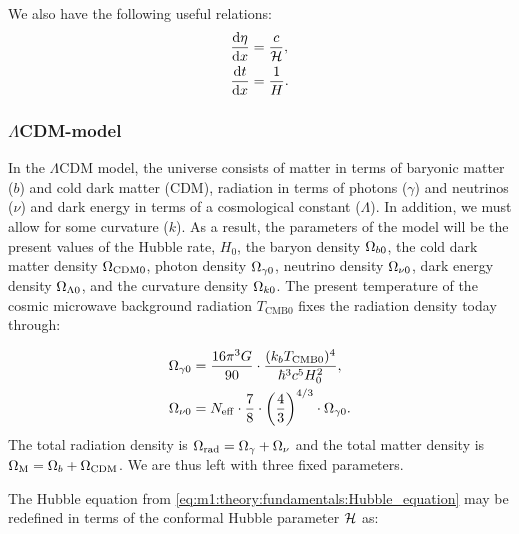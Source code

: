
    We also have the following useful relations:
    \begin{equation}
        \label{eq:m1:theory:measures:useful_relations}
        \begin{split}
            \dv{\eta}{x}&=\frac{c}{\mathcal{H}}, \\
             \dv{t}{x} &= \frac{1}{H}.
        \end{split}
    \end{equation}




\subsubsection{$\Lambda$CDM-model}

    In the $\Lambda$CDM model, the universe consists of matter in terms of baryonic matter ($b$) and cold dark matter (CDM), radiation in terms of photons ($\gamma$) and neutrinos ($\nu$) and dark energy in terms of a cosmological constant ($\Lambda$). In addition, we must allow for some curvature ($k$). As a result, the parameters of the model will be the present values of the Hubble rate, $H_0$, the baryon density $\Omega_{b0}$, the cold dark matter density $\Omega_{\mathrm{CDM}0}$, photon density $\Omega_{\gamma0}$, neutrino density $\Omega_{\nu0}$, dark energy density $\Omega_{\Lambda0}$, and the curvature density $\Omega_{k0}$. The present temperature of the cosmic microwave background radiation $T_{\mathrm{CMB}0}$ fixes the radiation density today through:

    \begin{equation}\label{eq:m1:theory:lambdaCDM:radiation_densities}
        \begin{split}
            \Omega_{\gamma0} &= \frac{16\pi^3G}{90}\cdot\frac{(k_b T_{\mathrm{CMB}0})^4}{\hbar^3c^5H_0^2}, \\
            \Omega_{\nu0} &= N_\mathrm{eff} \cdot\frac{7}{8} \cdot \left( \frac{4}{3} \right)^{4/3}\cdot \Omega_{\gamma0}.
        \end{split}
    \end{equation}
    The total radiation density is $\Omega_\mathrm{rad}=\Omega_\gamma+\Omega_\nu$ and the total matter density is $\Omega_\mathrm{M} = \Omega_b+\Omega_\mathrm{CDM}$. We are thus left with three fixed parameters. 

    The Hubble equation from \cref{eq:m1:theory:fundamentals:Hubble_equation} may be redefined in terms of the conformal Hubble parameter $\mathcal{H}$ as:
    
